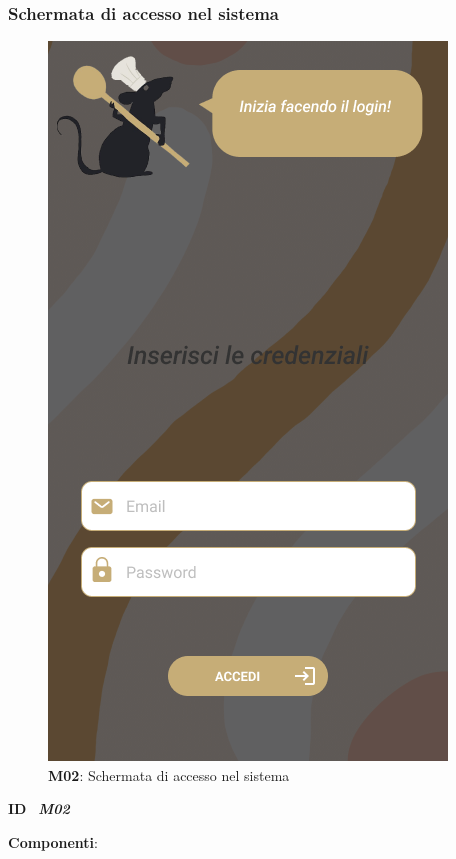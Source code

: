         \newpage

        \subsubsection{Schermata di accesso nel sistema}
            \begin{figure}[H]
                \centering
                \includegraphics[scale=0.5]{assets/Mockup/Mockup_Accesso.png}
                \caption{\textbf{M02}: Schermata di accesso nel sistema}\label{fig:Mockup_Login}
            \end{figure}
            \begin{flushleft}
                \textbf{ID} \ \Large{\textit{\textbf{M02}}}\\
            \end{flushleft}

            \textbf{Componenti}:

